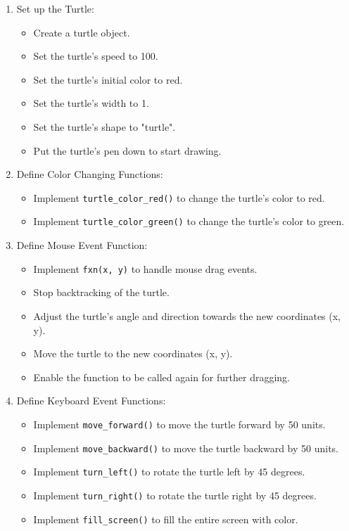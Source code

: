 \documentclass[12pt]{article}
\begin{document}
\begin{enumerate}[label=\arabic*.]
  \item Set up the Turtle:
    \begin{itemize}
      \item Create a turtle object.
      \item Set the turtle's speed to 100.
      \item Set the turtle's initial color to red.
      \item Set the turtle's width to 1.
      \item Set the turtle's shape to "turtle".
      \item Put the turtle's pen down to start drawing.
    \end{itemize}
  
  \item Define Color Changing Functions:
    \begin{itemize}
      \item Implement \texttt{turtle\_color\_red()} to change the turtle's color to red.
      \item Implement \texttt{turtle\_color\_green()} to change the turtle's color to green.
    \end{itemize}
  
  \item Define Mouse Event Function:
    \begin{itemize}
      \item Implement \texttt{fxn(x, y)} to handle mouse drag events.
      \item Stop backtracking of the turtle.
      \item Adjust the turtle's angle and direction towards the new coordinates (x, y).
      \item Move the turtle to the new coordinates (x, y).
      \item Enable the function to be called again for further dragging.
    \end{itemize}
  
  \item Define Keyboard Event Functions:
    \begin{itemize}
      \item Implement \texttt{move\_forward()} to move the turtle forward by 50 units.
      \item Implement \texttt{move\_backward()} to move the turtle backward by 50 units.
      \item Implement \texttt{turn\_left()} to rotate the turtle left by 45 degrees.
      \item Implement \texttt{turn\_right()} to rotate the turtle right by 45 degrees.
      \item Implement \texttt{fill\_screen()} to fill the entire screen with color.
    \end{itemize}
  

\end{enumerate}
\end{document}
